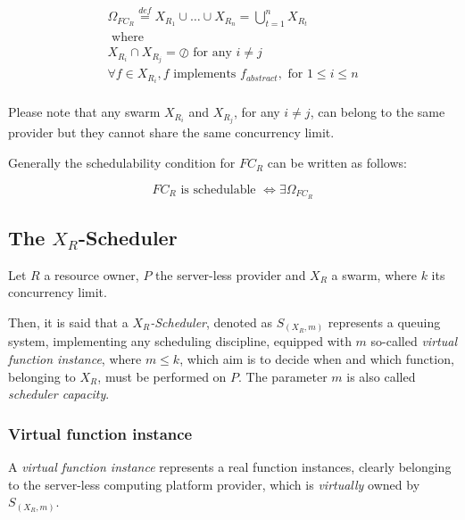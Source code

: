 \documentclass[10pt,a4paper]{article}
\newcommand{\mathDef}{\overset{\textit{def}}{=}}
\begin{document}
\begin{equation}
\begin{array}{c}
\Omega_{FC_R} \mathDef X_{{R}_{1}} \cup  \ldots \cup X_{{R}_{n}} = \bigcup_{t = 1}^n X_{{R}_{t}} \\

\text{ where } \\	

X_{{R}_{i}} \cap X_{{R}_{j}} = \oslash \text{ for any } i \neq j \\

\forall f \in X_{{R}_{i}}, f \text{ implements } f_{abstract}, \text{ for }  1 \leq i \leq n\\

\end{array}
\end{equation}

Please note that any swarm $X_{R_i}$ and $X_{R_j}$, for any $i \neq j$, can belong to the same provider but they cannot share the same concurrency limit.

Generally the schedulability condition for $FC_R$ can be written as follows:

\begin{equation}
FC_R \text{ is schedulable } \Leftrightarrow \exists \Omega_{FC_R}
\end{equation}


\subsection{The $X_R$-Scheduler}

Let $R$ a resource owner, $P$ the server-less provider and $X_{R}$ a swarm, where $k$ its concurrency limit.

Then, it is said that a \textit{$X_R$-Scheduler}, denoted as $S_{({X_{R}},m)}$ represents a queuing system, implementing any scheduling discipline, equipped with $m$ so-called \textit{virtual function instance}, where $m \leq k$, which aim is to decide when and which function, belonging to $X_{R}$, must be performed on $P$. The parameter $m$ is also called \textit{scheduler capacity}.

\subsubsection{Virtual function instance}

A \textit{virtual function instance} represents a real function instances, clearly belonging to the server-less computing platform provider, which is \textit{virtually} owned by $S_{({X_{R}},m)}$.
\end{document}
